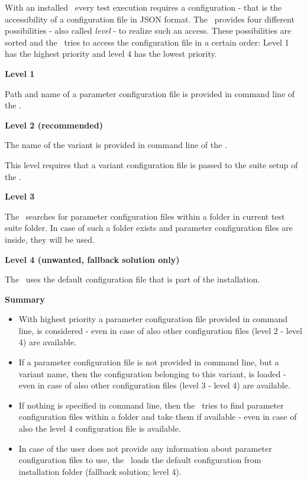 With an installed \pkg\ every test execution requires a configuration - that is the accessibility
of a configuration file in JSON format. The \pkg\ provides four different possibilities - also
called \textit{level} - to realize such an access. These possibilities are sorted and the \pkg\ tries to access
the configuration file in a certain order: Level 1 has the highest priority and level 4 has the lowest priority.

\textbf{Level 1}

Path and name of a parameter configuration file is provided in command line of the \rfwcore.

\textbf{Level 2 (recommended)}

The name of the variant is provided in command line of the \rfwcore.

This level requires that a variant configuration file is passed to the suite setup of the \pkg.

\textbf{Level 3}

The \pkg\ searches for parameter configuration files within a folder  in current test suite folder.
In case of such a folder exists and parameter configuration files are inside, they will be used.

\textbf{Level 4 (unwanted, fallback solution only)}

The \pkg\ uses the default configuration file that is part of the installation.

\vspace{2ex}

\textbf{Summary}

\begin{itemize}
   \item With highest priority a parameter configuration file provided in command line, is considered - even in case of also other
configuration files (level 2 - level 4) are available.
   \item If a parameter configuration file is not provided in command line, but a variant name, then the configuration belonging
to this variant, is loaded - even in case of also other configuration files (level 3 - level 4) are available.
   \item If nothing is specified in command line, then the \pkg\ tries to find parameter configuration files within a  folder
and take them if available - even in case of also the level 4 configuration file is available.
   \item In case of the user does not provide any information about parameter configuration files to use, the \pkg\ loads the
default configuration from installation folder (fallback solution; level 4).
\end{itemize}

